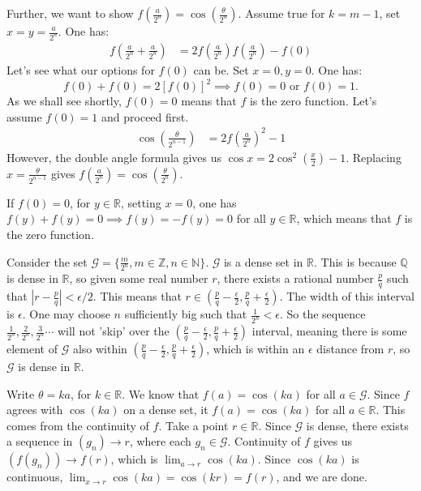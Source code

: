 \documentclass{article}
\begin{document}
Further, we want to show $f(\frac{a}{2^n}) = \cos(\frac{\theta}{2^n})$. Assume true for $k=m-1$, set $x=y=\frac{a}{2^n}$. One has:
\begin{align*}
    f\left(\frac{a}{2^n} + \frac{a}{2^n}\right) &= 2f\left(\frac{a}{2^n}\right)f\left(\frac{a}{2^n}\right) - f(0)
\end{align*}
Let's see what our options for $f(0)$ can be. Set $x=0, y=0$. One has:
\begin{equation*}
    f(0) + f(0) = 2[f(0)]^2 \implies f(0)=0 \text{ or } f(0)=1.
\end{equation*}
As we shall see shortly, $f(0)=0$ means that $f$ is the zero function. Let's assume $f(0)=1$ and proceed first.
\begin{align*}
    \cos\left(\frac{\theta}{2^{n-1}}\right) &= 2f\left(\frac{a}{2^n}\right)^2 - 1
\end{align*}
However, the double angle formula gives us $\cos x = 2\cos^2\left(\frac{x}{2}\right) - 1$. Replacing $x= \frac{\theta}{2^{n-1}}$ gives $f(\frac{a}{2^n}) = \cos(\frac{\theta}{2^n})$.

If $f(0)=0$, for $y \in \mathbb{R}$, setting $x=0$, one has $f(y)+f(y)=0 \implies f(y)=-f(y)=0$ for all $y \in \mathbb{R}$, which means that $f$ is the zero function. 

Consider the set $\mathscr{G} = \{\frac{m}{2^n}, m \in \mathbb{Z}, n \in \mathbb{N}\}$. $\mathscr{G}$ is a dense set in $\mathbb{R}$. This is because $\mathbb{Q}$ is dense in $\mathbb{R}$, so given some real number $r$, there exists a rational number $\frac{p}{q}$ such that $|r-\frac{p}{q}|<\epsilon/2$. This means that $r \in (\frac{p}{q} - \frac{\epsilon}{2}, \frac{p}{q} + \frac{\epsilon}{2})$. The width of this interval is $\epsilon$. One may choose $n$ sufficiently big such that $\frac{1}{2^n}<\epsilon$. So the sequence $\frac{1}{2^n}, \frac{2}{2^n}, \frac{3}{2^n} \cdots$ will not 'skip' over the $(\frac{p}{q} - \frac{\epsilon}{2}, \frac{p}{q} + \frac{\epsilon}{2})$ interval, meaning there is some element of $\mathscr{G}$ also within $(\frac{p}{q} - \frac{\epsilon}{2}, \frac{p}{q} + \frac{\epsilon}{2})$, which is within an $\epsilon$ distance from $r$, so $\mathscr{G}$ is dense in $\mathbb{R}$.

Write $\theta = ka$, for $k \in \mathbb{R}$. We know that $f(a) = \cos(ka)$ for all $a \in \mathscr{G}$. Since $f$ agrees with $\cos(ka)$ on a dense set, it $f(a) = \cos(ka)$ for all $a \in \mathbb{R}$. This comes from the continuity of $f$. Take a point $r \in \mathbb{R}$. Since $\mathscr{G}$ is dense, there exists a sequence in $(g_n) \to r$, where each $g_n \in \mathscr{G}$. Continuity of $f$ gives us $(f(g_n)) \to f(r)$, which is $\lim_{a \to r} \cos(ka)$. Since $\cos(ka)$ is continuous, $\lim_{x \to r} \cos(ka)=\cos(kr)=f(r)$, and we are done.
\end{document}
